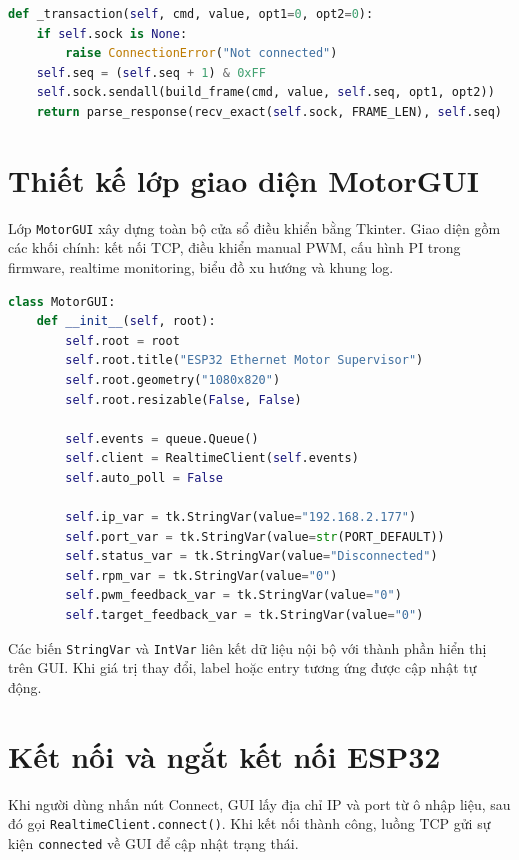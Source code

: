 \documentclass[12pt,a4paper]{report}
\begin{document}
\begin{lstlisting}[language=Python]
def _transaction(self, cmd, value, opt1=0, opt2=0):
    if self.sock is None:
        raise ConnectionError("Not connected")
    self.seq = (self.seq + 1) & 0xFF
    self.sock.sendall(build_frame(cmd, value, self.seq, opt1, opt2))
    return parse_response(recv_exact(self.sock, FRAME_LEN), self.seq)
\end{lstlisting}

\section{Thiết kế lớp giao diện MotorGUI}

Lớp \texttt{MotorGUI} xây dựng toàn bộ cửa sổ điều khiển bằng Tkinter. Giao diện gồm các khối chính: kết nối TCP, điều khiển manual PWM, cấu hình PI trong firmware, realtime monitoring, biểu đồ xu hướng và khung log.

\begin{lstlisting}[language=Python]
class MotorGUI:
    def __init__(self, root):
        self.root = root
        self.root.title("ESP32 Ethernet Motor Supervisor")
        self.root.geometry("1080x820")
        self.root.resizable(False, False)

        self.events = queue.Queue()
        self.client = RealtimeClient(self.events)
        self.auto_poll = False

        self.ip_var = tk.StringVar(value="192.168.2.177")
        self.port_var = tk.StringVar(value=str(PORT_DEFAULT))
        self.status_var = tk.StringVar(value="Disconnected")
        self.rpm_var = tk.StringVar(value="0")
        self.pwm_feedback_var = tk.StringVar(value="0")
        self.target_feedback_var = tk.StringVar(value="0")
\end{lstlisting}

Các biến \texttt{StringVar} và \texttt{IntVar} liên kết dữ liệu nội bộ với thành phần hiển thị trên GUI. Khi giá trị thay đổi, label hoặc entry tương ứng được cập nhật tự động.

\section{Kết nối và ngắt kết nối ESP32}

Khi người dùng nhấn nút Connect, GUI lấy địa chỉ IP và port từ ô nhập liệu, sau đó gọi \texttt{RealtimeClient.connect()}. Khi kết nối thành công, luồng TCP gửi sự kiện \texttt{connected} về GUI để cập nhật trạng thái.
\end{document}
